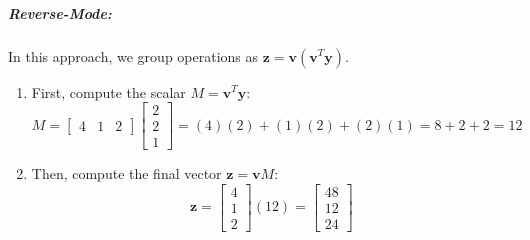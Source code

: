 \documentclass{article}
\begin{document}
\subparagraph{Reverse-Mode:} In this approach, we group operations as $\mathbf{z} = \mathbf{v}(\mathbf{v}^T\mathbf{y})$.
\begin{enumerate}
    \item First, compute the scalar $M = \mathbf{v}^T\mathbf{y}$:
    \[ M = \begin{bmatrix} 4 & 1 & 2 \end{bmatrix} \begin{bmatrix} 2 \\ 2 \\ 1 \end{bmatrix} = (4)(2) + (1)(2) + (2)(1) = 8 + 2 + 2 = 12 \]
    \item Then, compute the final vector $\mathbf{z} = \mathbf{v}M$:
    \[ \mathbf{z} = \begin{bmatrix} 4 \\ 1 \\ 2 \end{bmatrix} (12) = \begin{bmatrix} 48 \\ 12 \\ 24 \end{bmatrix} \]
\end{enumerate}
\end{document}
